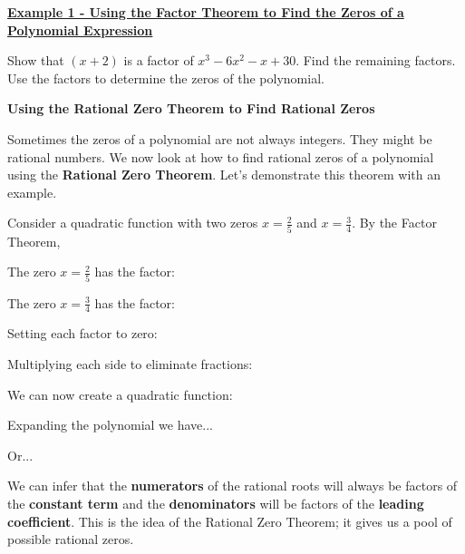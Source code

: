 \documentclass[12pt]{book}
\newcommand{\D}{\displaystyle}
\begin{document}
\underline{\textbf{Example 1 - Using the Factor Theorem to Find the Zeros of a Polynomial Expression}}

Show that $(x+2)$ is a factor of $x^3-6x^2-x+30$. Find the remaining factors. Use the factors to determine the zeros of the polynomial.

\newpage


\newpage
{\large \textbf{Using the Rational Zero Theorem to Find Rational Zeros}}

Sometimes the zeros of a polynomial are not always integers. They might be rational numbers. We now look at how to find rational zeros of a polynomial using the \textbf{Rational Zero Theorem}. Let's demonstrate this theorem with an example.

\vspace{3mm}

Consider a quadratic function with two zeros $\D x=\frac{2}{5}$ and $\D x=\frac{3}{4}$. By the Factor Theorem,

The zero $\D x=\frac{2}{5}$ has the factor: 
\vspace{2mm}

The zero $\D x=\frac{3}{4}$ has the factor: 
\vspace{2mm}

Setting each factor to zero: 

\vspace{20mm}

Multiplying each side to eliminate fractions:


\vspace{20mm}

We can now create a quadratic function:

\vspace{20mm}
Expanding the polynomial we have...

\vspace{20mm}
Or...

\vspace{40mm}



We can infer that the \textbf{numerators} of the rational roots will always be factors of the \textbf{constant term} and the \textbf{denominators} will be factors of the \textbf{leading coefficient}. This is the idea of the Rational Zero Theorem; it gives us a pool of possible rational zeros.

\newpage
\end{document}
